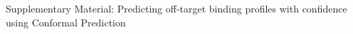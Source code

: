 \documentclass[10pt,article]{memoir}
\begin{document}
	
\begin{center}
\huge{Supplementary Material: Predicting off-target binding profiles with confidence using Conformal Prediction}
\end{center}


%
%
\end{document}
